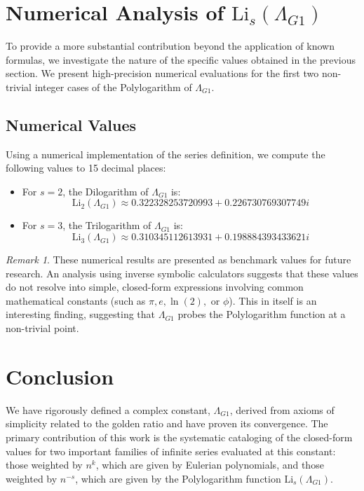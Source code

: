 \documentclass{amsart}
\theoremstyle{plain}
\theoremstyle{definition}
\theoremstyle{remark}
\newtheorem*{remark}{Remark}
\newcommand{\LambdaG}{\Lambda_{G1}}
\begin{document}
\section{Numerical Analysis of \texorpdfstring{$\mathrm{Li}_s(\LambdaG)$}{Li\_s(Lambda\_G1)}}
To provide a more substantial contribution beyond the application of known formulas, we investigate the nature of the specific values obtained in the previous section. We present high-precision numerical evaluations for the first two non-trivial integer cases of the Polylogarithm of $\LambdaG$.

\subsection{Numerical Values}
Using a numerical implementation of the series definition, we compute the following values to 15 decimal places:

\begin{itemize}
    \item For $s=2$, the Dilogarithm of $\LambdaG$ is:
    $$ \mathrm{Li}_2(\LambdaG) \approx 0.322328253720993 + 0.226730769307749i $$
    \item For $s=3$, the Trilogarithm of $\LambdaG$ is:
    $$ \mathrm{Li}_3(\LambdaG) \approx 0.310345112613931 + 0.198884393433621i $$
\end{itemize}

\begin{remark}
These numerical results are presented as benchmark values for future research. An analysis using inverse symbolic calculators suggests that these values do not resolve into simple, closed-form expressions involving common mathematical constants (such as $\pi, e, \ln(2),$ or $\phi$). This in itself is an interesting finding, suggesting that $\LambdaG$ probes the Polylogarithm function at a non-trivial point.
\end{remark}

\section{Conclusion}
We have rigorously defined a complex constant, $\LambdaG$, derived from axioms of simplicity related to the golden ratio and have proven its convergence. The primary contribution of this work is the systematic cataloging of the closed-form values for two important families of infinite series evaluated at this constant: those weighted by $n^k$, which are given by Eulerian polynomials, and those weighted by $n^{-s}$, which are given by the Polylogarithm function $\mathrm{Li}_s(\LambdaG)$.
\end{document}
